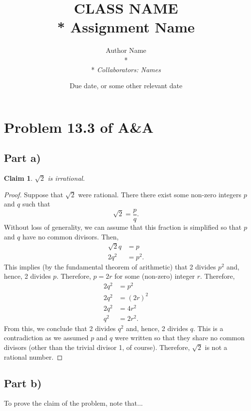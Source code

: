 \documentclass{article}
\title{\vspace*{-1cm} CLASS NAME \\* \textbf{Assignment Name}}
\author{Author Name \\* \\* \textit{Collaborators: Names}}
\date{Due date, or some other relevant date}
\newtheorem*{claim}{Claim}
\theoremstyle{definition}
\theoremstyle{plain}
\begin{document}
\maketitle
\thispagestyle{fancy}

\section*{Problem 13.3 of A\&A}
\subsection*{Part a)}
\begin{claim}
\(\sqrt{2}\) is irrational.
\end{claim}
\begin{proof}
Suppose that \(\sqrt{2}\) were rational. There there exist some non-zero integers \(p\) and \(q\) such that \[\sqrt{2} = \frac{p}{q}.\] Without loss of generality, we can assume that this fraction is simplified so that \(p\) and \(q\) have no common divisors. Then,
\begin{align*}
    \sqrt{2}q &= p \\
    2q^{2} &= p^{2}.
\end{align*}
This implies (by the fundamental theorem of arithmetic) that 2 divides \(p^{2}\) and, hence, 2 divides \(p.\) Therefore, \(p = 2r\) for some (non-zero) integer \(r.\) Therefore,
\begin{align*}
    2q^{2} &= p^{2} \\
    2q^{2} &= (2r)^{2} \\
    2q^{2} &= 4r^{2} \\
    q^{2} &= 2r^{2}.
\end{align*}
From this, we conclude that 2 divides \(q^{2}\) and, hence, 2 divides \(q.\) This is a contradiction as we assumed \(p\) and \(q\) were written so that they share no common divisors (other than the trivial divisor 1, of course). Therefore, \(\sqrt{2}\) is not a rational number.
\end{proof}

\subsection*{Part b)}
To prove the claim of the problem, note that...
\end{document}
